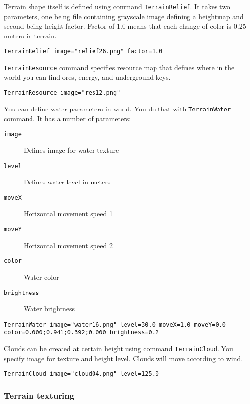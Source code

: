 Terrain shape itself is defined using command \texttt{TerrainRelief}. It takes two parameters, one being file containing grayscale image defining a heightmap and second being height factor. Factor of 1.0 means that each change of color is 0.25 meters in terrain.

\begin{verbatim}
TerrainRelief image="relief26.png" factor=1.0
\end{verbatim}

\texttt{TerrainResource} command specifies resource map that defines where in the world you can find ores, energy, and underground keys.

\begin{verbatim}
TerrainResource image="res12.png"
\end{verbatim}

You can define water parameters in world. You do that with \texttt{TerrainWater} command. It has a number of parameters:

\begin{description}
    \item[\texttt{image}] Defines image for water texture
    \item[\texttt{level}] Defines water level in meters
    \item[\texttt{moveX}] Horizontal movement speed 1
    \item[\texttt{moveY}] Horizontal movement speed 2
    \item[\texttt{color}] Water color
    \item[\texttt{brightness}] Water brightness
\end{description}

\begin{verbatim}
TerrainWater image="water16.png" level=30.0 moveX=1.0 moveY=0.0
color=0.000;0.941;0.392;0.000 brightness=0.2
\end{verbatim}

Clouds can be created at certain height using command \texttt{TerrainCloud}. You specify image for texture and height level. Clouds will move according to wind.

\begin{verbatim}
TerrainCloud image="cloud04.png" level=125.0
\end{verbatim}


\subsubsection{Terrain texturing}

